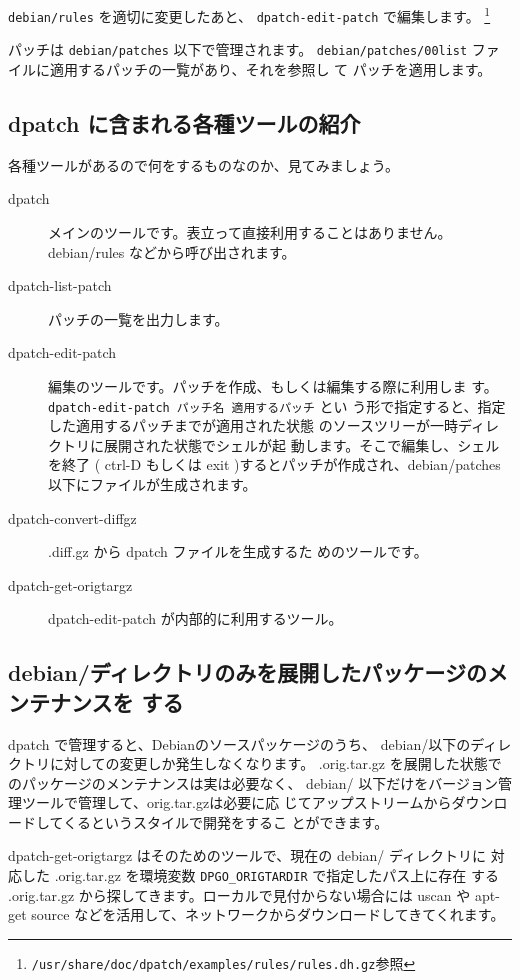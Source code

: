 \documentclass[mingoth,a4paper]{jsarticle}
\begin{document}
\texttt{debian/rules} を適切に変更したあと、
\texttt{dpatch-edit-patch} で編集します。
\footnote{\texttt{/usr/share/doc/dpatch/examples/rules/rules.dh.gz}参照}

パッチは \texttt{debian/patches} 以下で管理されます。
\texttt{debian/patches/00list} ファイルに適用するパッチの一覧があり、それを参照し
て パッチを適用します。

\subsection{dpatch に含まれる各種ツールの紹介}

各種ツールがあるので何をするものなのか、見てみましょう。

\begin{description}
 \item[dpatch] メインのツールです。表立って直接利用することはありません。
	    debian/rules などから呼び出されます。
 \item[dpatch-list-patch] パッチの一覧を出力します。
 \item[dpatch-edit-patch] 編集のツールです。パッチを作成、もしくは編集する際に利用しま
	    す。\texttt{dpatch-edit-patch パッチ名 適用するパッチ} とい
	    う形で指定すると、指定した適用するパッチまでが適用された状態
	    のソースツリーが一時ディレクトリに展開された状態でシェルが起
	    動します。そこで編集し、シェルを終了 ( ctrl-D もしくは exit
	    )するとパッチが作成され、debian/patches 以下にファイルが生成されます。
 \item[dpatch-convert-diffgz] .diff.gz から dpatch ファイルを生成するた
	    めのツールです。
 \item[dpatch-get-origtargz] dpatch-edit-patch が内部的に利用するツール。
\end{description}

\subsection{debian/ディレクトリのみを展開したパッケージのメンテナンスを
  する}

dpatch で管理すると、Debianのソースパッケージのうち、
debian/以下のディレクトリに対しての変更しか発生しなくなります。
.orig.tar.gz を展開した状態でのパッケージのメンテナンスは実は必要なく、
debian/ 以下だけをバージョン管理ツールで管理して、orig.tar.gzは必要に応
じてアップストリームからダウンロードしてくるというスタイルで開発をするこ
とができます。

dpatch-get-origtargz はそのためのツールで、現在の debian/ ディレクトリに
対応した .orig.tar.gz を環境変数 \verb!DPGO_ORIGTARDIR! で指定したパス上に存在
する .orig.tar.gz から探してきます。ローカルで見付からない場合には uscan や apt-get
source などを活用して、ネットワークからダウンロードしてきてくれます。
\end{document}
